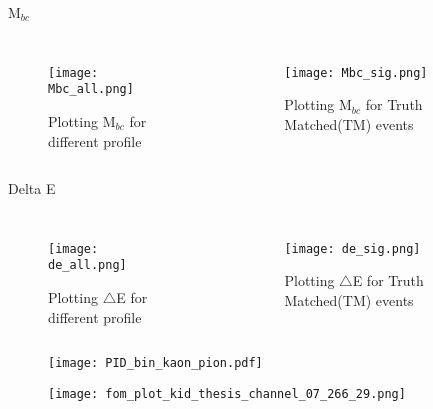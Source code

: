 \documentclass[12pt]{beamer}
\begin{document}
\begin{frame}[t]{M$_{bc}$}
\begin{scriptsize}
			\begin{columns}
		\begin{figure}
			\texttt{[image: Mbc\_all.png]}
			\caption{Plotting M$_{bc}$ for different profile}
		\end{figure}
		
		\begin{figure}
			\texttt{[image: Mbc\_sig.png]}
			\caption{Plotting M$_{bc}$ for Truth Matched(TM) events}
		\end{figure}
		
	\end{columns}
\end{scriptsize}
\end{frame}

\begin{frame}[t]{Delta E}
	\begin{scriptsize}
		\begin{columns}
			\column{0.5\textwidth}
			\begin{figure}
				\texttt{[image: de\_all.png]}
				\caption{Plotting $\bigtriangleup$E for different profile}
			\end{figure}
			
			\column{0.5\textwidth}
			\begin{figure}
				\texttt{[image: de\_sig.png]}
				\caption{Plotting $\bigtriangleup$E for Truth Matched(TM) events}
			\end{figure}
			
		\end{columns}
	\end{scriptsize}
\end{frame}

\begin{frame}{}                                                                           
	\begin{figure}
		\texttt{[image: PID\_bin\_kaon\_pion.pdf]}
	\end{figure}
\end{frame}

\begin{frame}{}                                                                           
	\begin{figure}
		\texttt{[image: fom\_plot\_kid\_thesis\_channel\_07\_266\_29.png]}
	\end{figure}
\end{frame}
\end{document}
